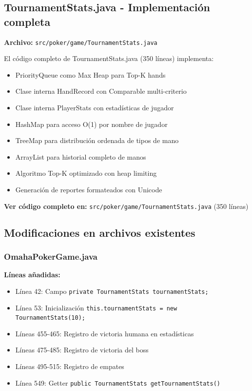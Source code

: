 \documentclass[12pt,a4paper]{article}
\begin{document}
\subsection{TournamentStats.java - Implementación completa}

\textbf{Archivo:} \texttt{src/poker/game/TournamentStats.java}

El código completo de TournamentStats.java (350 líneas) implementa:
\begin{itemize}
    \item PriorityQueue como Max Heap para Top-K hands
    \item Clase interna HandRecord con Comparable multi-criterio
    \item Clase interna PlayerStats con estadísticas de jugador
    \item HashMap para acceso O(1) por nombre de jugador
    \item TreeMap para distribución ordenada de tipos de mano
    \item ArrayList para historial completo de manos
    \item Algoritmo Top-K optimizado con heap limiting
    \item Generación de reportes formateados con Unicode
\end{itemize}

\textbf{Ver código completo en:} \texttt{src/poker/game/TournamentStats.java} (350 líneas)

\subsection{Modificaciones en archivos existentes}

\subsubsection{OmahaPokerGame.java}

\textbf{Líneas añadidas:}
\begin{itemize}
    \item Línea 42: Campo \texttt{private TournamentStats tournamentStats;}
    \item Línea 53: Inicialización \texttt{this.tournamentStats = new TournamentStats(10);}
    \item Líneas 455-465: Registro de victoria humana en estadísticas
    \item Líneas 475-485: Registro de victoria del boss
    \item Líneas 495-515: Registro de empates
    \item Línea 549: Getter \texttt{public TournamentStats getTournamentStats()}
\end{itemize}
\end{document}
